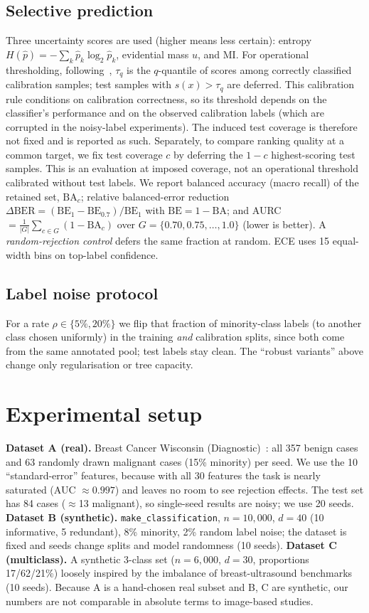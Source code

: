 \documentclass[conference]{IEEEtran}
\newcommand{\BA}{\mathrm{BA}}
\begin{document}
\subsection{Selective prediction}
Three uncertainty scores are used (higher means less certain): entropy $H(\hat p)=-\sum_k\hat p_k\log_2\hat p_k$, evidential mass $u$, and MI. For operational thresholding, following~\cite{aperstein2026selective}, $\tau_q$ is the $q$-quantile of scores among correctly classified calibration samples; test samples with $s(x)>\tau_q$ are deferred. This calibration rule conditions on calibration correctness, so its threshold depends on the classifier's performance and on the observed calibration labels (which are corrupted in the noisy-label experiments). The induced test coverage is therefore not fixed and is reported as such. Separately, to compare ranking quality at a common target, we fix test coverage $c$ by deferring the $1-c$ highest-scoring test samples. This is an evaluation at imposed coverage, not an operational threshold calibrated without test labels. We report balanced accuracy (macro recall) of the retained set, $\BA_c$; relative balanced-error reduction $\Delta\mathrm{BER}=(\mathrm{BE}_{1}-\mathrm{BE}_{0.7})/\mathrm{BE}_{1}$ with $\mathrm{BE}=1-\BA$; and AURC$=\frac1{|G|}\sum_{c\in G}(1-\BA_c)$ over $G=\{0.70,0.75,\dots,1.0\}$ (lower is better). A \emph{random-rejection control} defers the same fraction at random. ECE uses 15 equal-width bins on top-label confidence.

\subsection{Label noise protocol}
For a rate $\rho\in\{5\%,20\%\}$ we flip that fraction of minority-class labels (to another class chosen uniformly) in the training \emph{and} calibration splits, since both come from the same annotated pool; test labels stay clean. The ``robust variants'' above change only regularisation or tree capacity.

\section{Experimental setup}
\textbf{Dataset A (real).} Breast Cancer Wisconsin (Diagnostic)~\cite{street1993wisconsin}: all 357 benign cases and 63 randomly drawn malignant cases (15\% minority) per seed. We use the 10 ``standard-error'' features, because with all 30 features the task is nearly saturated (AUC $\approx0.997$) and leaves no room to see rejection effects. The test set has 84 cases ($\approx$13 malignant), so single-seed results are noisy; we use 20 seeds. \textbf{Dataset B (synthetic).} \texttt{make\_classification}, $n{=}10{,}000$, $d{=}40$ (10 informative, 5 redundant), 8\% minority, 2\% random label noise; the dataset is fixed and seeds change splits and model randomness (10 seeds). \textbf{Dataset C (multiclass).} A synthetic 3-class set ($n{=}6{,}000$, $d{=}30$, proportions 17/62/21\%) loosely inspired by the imbalance of breast-ultrasound benchmarks (10 seeds). Because A is a hand-chosen real subset and B, C are synthetic, our numbers are not comparable in absolute terms to image-based studies.
\end{document}

